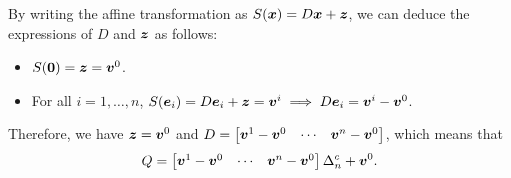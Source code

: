 \begin{enumerate}
\begin{pf}
\begin{center}
\end{center}
By writing the affine transformation as \(S(\bm{x})=D\bm{x}+\bm{z}\), we
can deduce the expressions of \(D\) and \(\bm{z}\) as follows:
\begin{itemize}
\item \(S(\bm{0})=\bm{z}=\bm{v}^{0}\).
\item For all \(i=1,\dotsc,n\),
\(S(\bm{e}_i)=D\bm{e}_{i}+\bm{z}=\bm{v}^{i}\implies 
D\bm{e}_i=\bm{v}^{i}-\bm{v}^{0}\).
\end{itemize}
Therefore, we have \(\bm{z}=\bm{v}^{0}\) and
\(D=\begin{bmatrix}\bm{v}^{1}-\bm{v}^{0}
&\cdots&\bm{v}^{n}-\bm{v}^{0}\end{bmatrix}\), which means that
\[Q=\begin{bmatrix}\bm{v}^{1}-\bm{v}^{0}
&\cdots&\bm{v}^{n}-\bm{v}^{0}\end{bmatrix}\Delta_n^{c}+\bm{v}^{0}.\]


\end{pf}
\end{enumerate}
